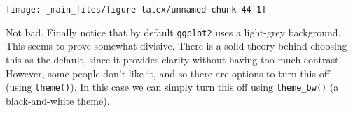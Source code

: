 \documentclass[]{book}
\newenvironment{Shaded}{\begin{snugshade}}{\end{snugshade}}
\newcommand{\KeywordTok}[1]{\textcolor[rgb]{0.13,0.29,0.53}{\textbf{{#1}}}}
\newcommand{\DataTypeTok}[1]{\textcolor[rgb]{0.13,0.29,0.53}{{#1}}}
\newcommand{\DecValTok}[1]{\textcolor[rgb]{0.00,0.00,0.81}{{#1}}}
\newcommand{\StringTok}[1]{\textcolor[rgb]{0.31,0.60,0.02}{{#1}}}
\newcommand{\NormalTok}[1]{{#1}}
\theoremstyle{definition}
\theoremstyle{definition}
\theoremstyle{definition}
\theoremstyle{remark}
\begin{document}
\begin{Shaded}
\end{Shaded}

\begin{center}\texttt{[image: \_main\_files/figure-latex/unnamed-chunk-44-1]} \end{center}

Not bad. Finally notice that by default \texttt{ggplot2} uses a
light-grey background. This seems to prove somewhat divisive. There is a
solid theory behind choosing this as the default, since it provides
clarity without having too much contrast. However, some people don't
like it, and so there are options to turn this off (using
\texttt{theme()}). In this case we can simply turn this off using
\texttt{theme\_bw()} (a black-and-white theme).
\end{document}
